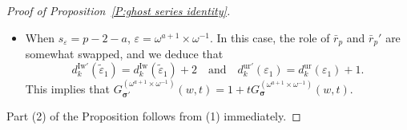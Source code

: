 \documentclass[12pt]{amsart}
\theoremstyle{definition}
\numberwithin{equation}{subsection}
\newcommand{\bbsigma}{\boldsymbol{\sigma}}
\newcommand{\Iw}{\mathrm{Iw}}
\newcommand{\ur}{\mathrm{ur}}
\begin{document}
\begin{proof}[Proof of Proposition~\ref{P:ghost series identity}]
\begin{itemize}
$$$$
This implies that $m_n^{(\varepsilon)}(k) = m_{n+1}^{(\varepsilon)\prime}(k)$. It  follows that $G_{\bbsigma}^{(1\times\omega^a)}(w,t) = 1+ tG_{\bbsigma'}^{(1\times\omega^a)}(w,t)$.
\item When $s_\varepsilon =p-2-a$, $\varepsilon = \omega^{a+1} \times \omega^{-1}$. In this case, the role of $\bar r_p$ and $\bar r_p'$ are somewhat swapped, and we deduce that
$$
d_k^{\Iw\prime}(\tilde \varepsilon_1) = d_{k}^{\Iw}(\tilde \varepsilon_1)+2 \quad \textrm{and}\quad d_k^{\ur\prime}(\varepsilon_1) = d_{k}^{\ur}(\varepsilon_1)+1.
$$
This implies that $G_{\bbsigma'}^{(\omega^{a+1} \times \omega^{-1})}(w,t) = 1+ tG_{\bbsigma}^{(\omega^{a+1} \times \omega^{-1})}(w,t)$.
\end{itemize} 

Part (2) of the Proposition follows from (1) immediately.
\end{proof}
\end{document}

